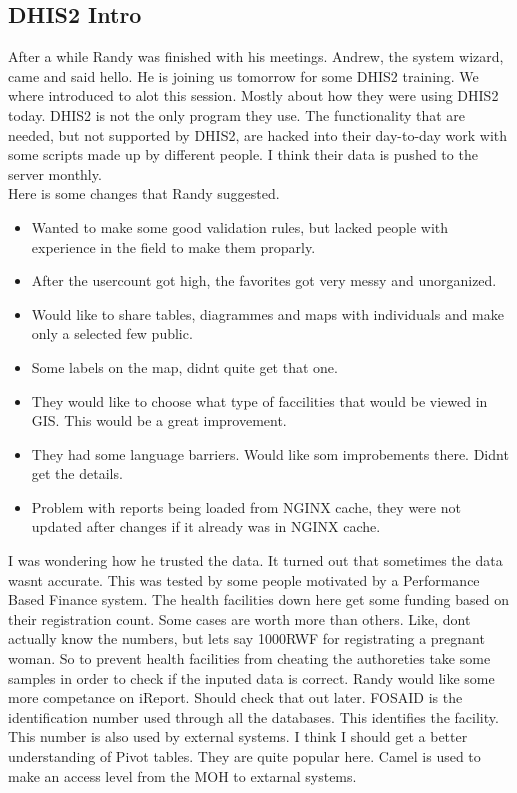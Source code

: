 \subsection{DHIS2 Intro}
After a while Randy was finished with his meetings. Andrew, the system wizard, came and said hello. He is joining us tomorrow for some DHIS2 training.
We where introduced to alot this session. Mostly about how they were using DHIS2 today. DHIS2 is not the only program they use. The functionality that are needed, but not supported by DHIS2, are hacked into their day-to-day work with some scripts made up by different people. I think their data is pushed to the server monthly. \\
Here is some changes that Randy suggested.
\begin{itemize}
\item Wanted to make some good validation rules, but lacked people with experience in the field to make them proparly.
\item After the usercount got high, the favorites got very messy and unorganized.
\item Would like to share tables, diagrammes and maps with individuals and make only a selected few public.
\item Some labels on the map, didnt quite get that one.
\item They would like to choose what type of faccilities that would be viewed in GIS. This would be a great improvement.
\item They had some language barriers. Would like som improbements there. Didnt get the details.
\item Problem with reports being loaded from NGINX cache, they were not updated after changes if it already was in NGINX cache.
\end{itemize} 
I was wondering how he trusted the data. It turned out that sometimes the data wasnt accurate. This was tested by some people motivated by a Performance Based Finance system. The health facilities down here get some funding based on their registration count. Some cases are worth more than others. Like, dont actually know the numbers, but lets say 1000RWF for registrating a pregnant woman. So to prevent health facilities from cheating the authoreties take some samples in order to check if the inputed data is correct. Randy would like some more competance on iReport. Should check that out later. FOSAID is the identification number used through all the databases. This identifies the facility. This number is also used by external systems. I think I should get a better understanding of Pivot tables. They are quite popular here. Camel is used to make an access level from the MOH to extarnal systems.\\
